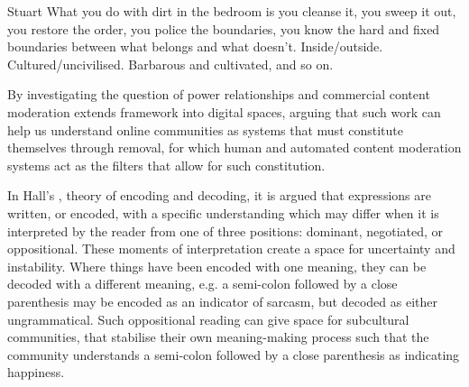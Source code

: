 \begin{citequote}{Stuart \citet[p.3]{Hall:1997}}
  What you do with dirt in the bedroom is you cleanse it, you sweep it out, you restore the order, you police the boundaries, you know the hard and fixed boundaries between what belongs and what doesn't. Inside/outside. Cultured/uncivilised. Barbarous and cultivated, and so on.
\end{citequote}

By investigating the question of power relationships and commercial content moderation \citet{Lepawsky:2019} extends \citet{Douglas:1966} framework into digital spaces, arguing that such work can help us understand online communities as systems that must constitute themselves through removal, for which human and automated content moderation systems act as the filters that allow for such constitution.

In Hall's \citeyear{Hall:1997}, theory of encoding and decoding, it is argued that expressions are written, or encoded, with a specific understanding which may differ when it is interpreted by the reader from one of three positions: dominant, negotiated, or oppositional.
These moments of interpretation create a space for uncertainty and instability.
Where things have been encoded with one meaning, they can be decoded with a different meaning, e.g.
a semi-colon followed by a close parenthesis may be encoded as an indicator of sarcasm, but decoded as either ungrammatical.
Such oppositional reading can give space for subcultural communities, that stabilise their own meaning-making process such that the community understands a semi-colon followed by a close parenthesis as indicating happiness.

